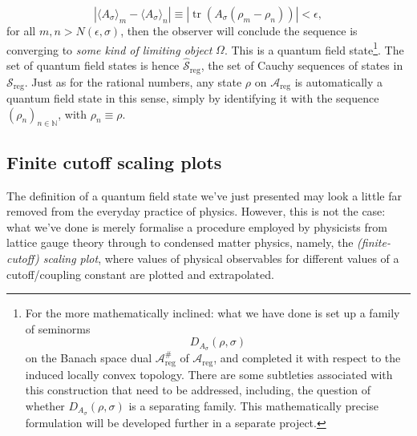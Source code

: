 \documentclass[11pt]{amsart}
\DeclareMathOperator{\tr}{tr}
\theoremstyle{plain}%
\theoremstyle{definition}
\theoremstyle{remark}
\begin{document}
\begin{equation}\label{eq:qftCauchycondn}
	|\langle A_\sigma\rangle_m - \langle A_\sigma \rangle_n| \equiv |\tr(A_\sigma (\rho_m - \rho_n))| < \epsilon,
\end{equation}
for all $m,n>N(\epsilon,\sigma)$, then the observer will conclude the sequence is converging to \emph{some kind of limiting object} $\Omega$. This is a quantum field state\footnote{For the more mathematically inclined: what we have done is set up a family of seminorms 
\begin{equation}
	D_{A_\sigma}(\rho, \sigma)
\end{equation}
on the Banach space dual $\mathcal{A}_{\text{reg}}^{\#}$ of $\mathcal{A}_{\text{reg}}$, and completed it with respect to the induced locally convex topology. There are some subtleties associated with this construction that need to be addressed, including, the question of whether $D_{A_\sigma}(\rho, \sigma)$ is a separating family. This mathematically precise formulation will be developed further in a separate project.}. The set of quantum field states is hence $\widehat{\mathcal{S}}_{\text{reg}}$, the set of Cauchy sequences of states in $\mathcal{S}_{\text{reg}}$. Just as for the rational numbers, any state $\rho$ on $\mathcal{A}_{\text{reg}}$ is automatically a quantum field state in this sense, simply by identifying it with the sequence $(\rho_n)_{n\in\mathbb{N}}$, with $\rho_n \equiv \rho$.

\subsection{Finite cutoff scaling plots}
The definition of a quantum field state we've just presented may look a little far removed from the everyday practice of physics. However, this is not the case: what we've done is merely formalise a procedure employed by physicists from lattice gauge theory through to condensed matter physics, namely, the \emph{(finite-cutoff) scaling plot}, where values of physical observables for different values of a cutoff/coupling constant are plotted and extrapolated. 
\end{document}
